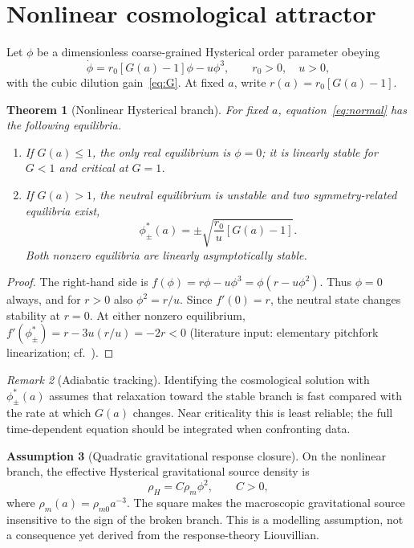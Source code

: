 \documentclass[11pt]{article}
\newtheorem{theorem}{Theorem}[section]
\theoremstyle{definition}
\newtheorem{assumption}[theorem]{Assumption}
\theoremstyle{remark}
\newtheorem{remark}[theorem]{Remark}
\begin{document}
\section{Nonlinear cosmological attractor}
\label{sec:attractor}
Let $\phi$ be a dimensionless coarse-grained Hysterical order parameter obeying
\begin{equation}
\label{eq:normal}
\dot\phi=r_0[G(a)-1]\phi-u\phi^3,
\qquad r_0>0,\quad u>0,
\end{equation}
with the cubic dilution gain~\eqref{eq:G}.
At fixed $a$, write $r(a)=r_0[G(a)-1]$.

\begin{theorem}[Nonlinear Hysterical branch]
\label{thm:pitchfork}
For fixed $a$, equation~\eqref{eq:normal} has the following equilibria.
\begin{enumerate}
\item If $G(a)\le1$, the only real equilibrium is $\phi=0$; it is linearly stable for $G<1$ and critical at $G=1$.
\item If $G(a)>1$, the neutral equilibrium is unstable and two symmetry-related equilibria exist,
\begin{equation}
\label{eq:branches}
\boxed{\phi_\pm^*(a)=\pm\sqrt{\frac{r_0}{u}[G(a)-1]}.}
\end{equation}
Both nonzero equilibria are linearly asymptotically stable.
\end{enumerate}
\end{theorem}

\begin{proof}
The right-hand side is $f(\phi)=r\phi-u\phi^3=\phi(r-u\phi^2)$.
Thus $\phi=0$ always, and for $r>0$ also $\phi^2=r/u$.
Since $f'(0)=r$, the neutral state changes stability at $r=0$.
At either nonzero equilibrium, $f'(\phi_\pm^*)=r-3u(r/u)=-2r<0$
(literature input: elementary pitchfork linearization; cf.~\cite{perko2001}).
\end{proof}

\begin{remark}[Adiabatic tracking]
\label{rem:adiabatic}
Identifying the cosmological solution with $\phi_\pm^*(a)$ assumes that relaxation toward the stable branch is fast compared with the rate at which $G(a)$ changes.
Near criticality this is least reliable; the full time-dependent equation should be integrated when confronting data.
\end{remark}

\begin{assumption}[Quadratic gravitational response closure]
\label{ass:closure}
On the nonlinear branch, the effective Hysterical gravitational source density is
\begin{equation}
\label{eq:rho-closure}
\boxed{\rho_H=C\rho_m\phi^2,}\qquad C>0,
\end{equation}
where $\rho_m(a)=\rho_{m0}a^{-3}$.
The square makes the macroscopic gravitational source insensitive to the sign of the broken branch.
This is a modelling assumption, not a consequence yet derived from the response-theory Liouvillian.
\end{assumption}
\end{document}
